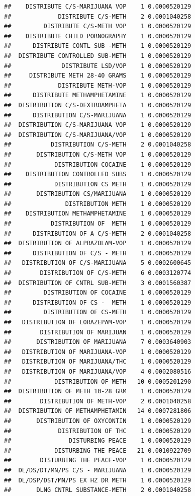 \documentclass[]{book}
\begin{document}
\begin{verbatim}
##    DISTRIBUTE C/S-MARIJUANA VOP    1 0.0000520129
##             DISTRIBUTE C/S-METH    2 0.0001040258
##         DISTRIBUTE C/S-METH VOP    1 0.0000520129
##    DISTRIBUTE CHILD PORNOGRAPHY    1 0.0000520129
##      DISTRIBUTE CONTL SUB -METH    1 0.0000520129
##  DISTRIBUTE CONTROLLED SUB-METH    1 0.0000520129
##              DISTRIBUTE LSD/VOP    1 0.0000520129
##     DISTRIBUTE METH 28-40 GRAMS    1 0.0000520129
##             DISTRIBUTE METH-VOP    1 0.0000520129
##      DISTRIBUTE METHAMPHETAMINE    1 0.0000520129
##  DISTRIBUTION C/S-DEXTROAMPHETA    1 0.0000520129
##      DISTRIBUTION C/S-MARIJUANA    1 0.0000520129
##  DISTRIBUTION C/S-MARIJUANA VOP    1 0.0000520129
##  DISTRIBUTION C/S-MARIJUANA/VOP    1 0.0000520129
##           DISTRIBUTION C/S-METH    2 0.0001040258
##       DISTRIBUTION C/S-METH VOP    1 0.0000520129
##            DISTRIBUTION COCAINE    1 0.0000520129
##    DISTRIBUTION CONTROLLED SUBS    1 0.0000520129
##            DISTRIBUTION CS METH    1 0.0000520129
##       DISTRIBUTION CS/MARIJUANA    1 0.0000520129
##               DISTRIBUTION METH    1 0.0000520129
##    DISTRIBUTION METHAMPHETAMINE    1 0.0000520129
##           DISTRIBUTION OF  METH    1 0.0000520129
##      DISTRIBUTION OF A C/S-METH    2 0.0001040258
##  DISTRIBUTION OF ALPRAZOLAM-VOP    1 0.0000520129
##      DISTRIBUTION OF C/S - METH    1 0.0000520129
##   DISTRIBUTION OF C/S-MARIJUANA    5 0.0002600645
##        DISTRIBUTION OF C/S-METH    6 0.0003120774
##  DISTRIBUTION OF CNTRL SUB-METH    3 0.0001560387
##         DISTRIBUTION OF COCAINE    1 0.0000520129
##      DISTRIBUTION OF CS -  METH    1 0.0000520129
##         DISTRIBUTION OF CS-METH    1 0.0000520129
##   DISTRIBUTION OF LORAZEPAM-VOP    1 0.0000520129
##        DISTRIBUTION OF MARIJUAN    1 0.0000520129
##       DISTRIBUTION OF MARIJUANA    7 0.0003640903
##   DISTRIBUTION OF MARIJUANA-VOP    1 0.0000520129
##   DISTRIBUTION OF MARIJUANA/THC    1 0.0000520129
##   DISTRIBUTION OF MARIJUANA/VOP    4 0.0002080516
##            DISTRIBUTION OF METH   10 0.0005201290
##  DISTRIBUTION OF METH 10-28 GRM    1 0.0000520129
##        DISTRIBUTION OF METH-VOP    2 0.0001040258
##  DISTRIBUTION OF METHAMPHETAMIN   14 0.0007281806
##       DISTRIBUTION OF OXYCONTIN    1 0.0000520129
##             DISTRIBUTION OF THC    1 0.0000520129
##                DISTURBING PEACE    1 0.0000520129
##            DISTURBING THE PEACE   21 0.0010922709
##        DISTURBING THE PEACE-VOP    1 0.0000520129
##  DL/DS/DT/MN/PS C/S - MARIJUANA    1 0.0000520129
##  DL/DSP/DST/MN/PS EX HZ DR METH    1 0.0000520129
##       DLNG CNTRL SUBSTANCE-METH    2 0.0001040258

\end{verbatim}
\end{document}

